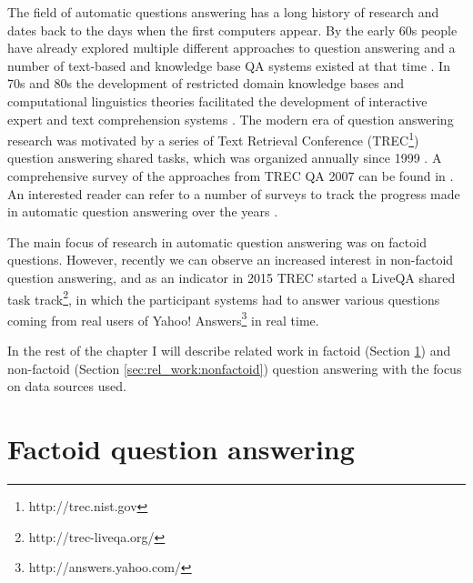 %

\label{chapter:related}

\noindent

The field of automatic questions answering has a long history of research and dates back to the days when the first computers appear.
By the early 60s people have already explored multiple different approaches to question answering and a number of text-based and knowledge base QA systems existed at that time \cite{Simmons:1965:AEQ:363707.363732,Simmons:1970:NLQ:361953.361963}.
In 70s and 80s the development of restricted domain knowledge bases and computational linguistics theories facilitated the development of interactive expert and text comprehension systems \cite{androutsopoulos1995natural,shortliffe1975model,woods1977lunar,wilensky1988berkeley}.
The modern era of question answering research was motivated by a series of Text Retrieval Conference (TREC\footnote{http://trec.nist.gov}) question answering shared tasks, which was organized annually since 1999 \cite{voorhees2001trec}.
A comprehensive survey of the approaches from TREC QA 2007 can be found in \cite{dang2007overview}.
An interested reader can refer to a number of surveys to track the progress made in automatic question answering over the years  \cite{hirschman2001natural,andrenucci2005automated,wang2006survey,Kolomiyets:2011:SQA:2046840.2047162,prager2006open,allam2012question,gupta2012survey}.

The main focus of research in automatic question answering was on factoid questions.
However, recently we can observe an increased interest in non-factoid question answering, and as an indicator in 2015 TREC started a LiveQA shared task track\footnote{http://trec-liveqa.org/}, in which the participant systems had to answer various questions coming from real users of Yahoo! Answers\footnote{http://answers.yahoo.com/} in real time.

In the rest of the chapter I will describe related work in factoid (Section \ref{sec:rel_work:factoid}) and non-factoid (Section \ref{sec:rel_work:nonfactoid}) question answering with the focus on data sources used.

\section{Factoid question answering}
\label{sec:rel_work:factoid}

